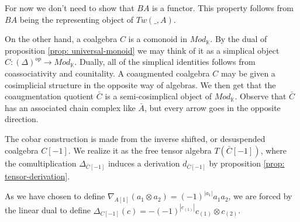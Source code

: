 \documentclass[../thesis.tex]{subfiles}
\begin{document}
            \begin{remark}
                For now we don't need to show that $BA$ is a functor. This property follows from $BA$ being the representing object of $Tw(\_,A)$.
            \end{remark}

            On the other hand, a coalgebra $C$ is a comonoid in $Mod_\mathbb{K}$. By the dual of proposition \ref{prop: universal-monoid} we may think of it as a simplical object $C:(\Delta)^{op} \rightarrow Mod_\mathbb{K}$. Dually, all of the simplical identities follows from coassociativity and counitality. A coaugmented coalgebra $C$ may be given a cosimplicial structure in the opposite way of algebras. We then get that the coaugmentation quotient $\bar{C}$ is a semi-cosimplical object of $Mod_\mathbb{K}$. Observe that $\bar{C}$ has an associated chain complex like $\bar{A}$, but every arrow goes in the opposite direction.

            \begin{center}

            \end{center}
            
            The cobar construction is made from the inverse shifted, or desuspended coalgebra $C[-1]$. We realize it as the free tensor algebra $T(\bar{C}[-1])$, where the comultiplication $\Delta_{\bar{C}[-1]}$ induces a derivation $d_{\bar{C}[-1]}$ by proposition \ref{prop: tensor-derivation}.

            \begin{remark}
                As we have chosen to define $\nabla_{A[1]}(a_1\otimes a_2)=(-1)^{|a_1|}a_1a_2$, we are forced by the linear dual to define $\Delta_{C[-1]}(c)=-(-1)^{|c_{(1)}|}c_{(1)}\otimes c_{(2)}$.
            \end{remark}
\end{document}
